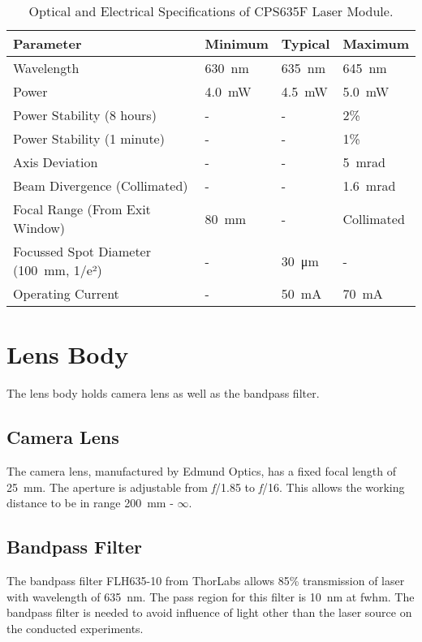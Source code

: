     \begin{table}[h]
        \centering
        \footnotesize
        \renewcommand{\arraystretch}{1.2}
        \begin{tabular}{p{6cm}p{2cm}p{2cm}p{2cm}}
            \toprule
            \textbf{Parameter} & \textbf{Minimum} & \textbf{Typical} & \textbf{Maximum} \\
            \midrule
            Wavelength & \SI{630}{\nano\meter} & \SI{635}{\nano\meter} & \SI{645}{\nano\meter} \\
            Power & \SI{4.0}{\milli\watt} & \SI{4.5}{\milli\watt} & \SI{5.0}{\milli\watt} \\
            Power Stability (8 hours) & - & - & 2\% \\
            Power Stability (1 minute) & - & - & 1\% \\
            Axis Deviation & - & - & \SI{5}{\milli\radian} \\
            Beam Divergence (Collimated) & - & - & \SI{1.6}{\milli\radian} \\
            Focal Range (From Exit Window) & \SI{80}{\milli\meter} & - & Collimated \\
            Focussed Spot Diameter (\SI{100}{\milli\meter}, 1/e²) & - & \SI{30}{\micro\meter} & - \\ 
            Operating Current & - & \SI{50}{\milli\ampere} & \SI{70}{\milli\ampere} \\
            \bottomrule
        \end{tabular}
        \caption{Optical and Electrical Specifications of CPS635F Laser Module. \cite{thorlabs_laser}}
        \label{table:laser_module_specs}
    \end{table}

\clearpage

\section{Lens Body}
    The lens body holds camera lens as well as the bandpass filter. 
    \subsection*{Camera Lens}
    The camera lens, manufactured by Edmund Optics, has a fixed focal length of \SI{25}{\milli\meter}. The aperture is adjustable from \emph{f}/1.85 to \emph{f}/16. This allows the working distance to be in range \SI{200}{\milli\meter} - $\infty$.

    \subsection*{Bandpass Filter}
    The bandpass filter FLH635-10 from ThorLabs allows 85\% transmission of laser with wavelength of \SI{635}{\nano\meter}. The pass region for this filter is \SI{10}{\nano\meter} at \gls{fwhm}. The bandpass filter is needed to avoid influence of light other than the laser source on the conducted experiments.

